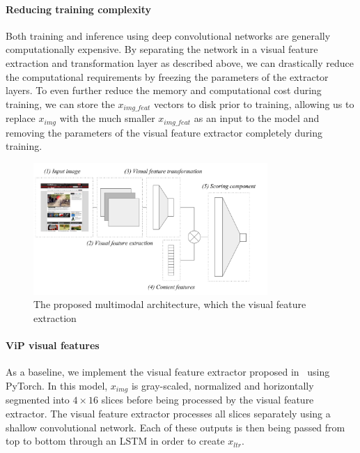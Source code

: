\paragraph{Reducing training complexity}
Both training and inference using deep convolutional networks are generally computationally expensive.
By separating the network in a visual feature extraction and transformation layer as described above, we can drastically reduce the computational requirements by freezing the parameters of the extractor layers.
To even further reduce the memory and computational cost during training, we can store the $x_{img\_feat}$ vectors to disk prior to training, allowing us to replace $x_{img}$ with the much smaller $x_{img\_feat}$ as an input to the model and removing the parameters of the visual feature extractor completely during training.

\begin{figure}[t]
\includegraphics[width = 3.5in]{images/multimodelarchitecture.pdf}
\caption{The proposed multimodal architecture, which the visual feature extraction}
\label{fig:multimodelarchitecture}
\end{figure}

\paragraph{ViP visual features}
As a baseline, we implement the visual feature extractor proposed in~\citet{fan2017learning} using PyTorch.
In this model, $x_{img}$ is gray-scaled, normalized and horizontally segmented into $4\times16$ slices before being processed by the visual feature extractor. The visual feature extractor processes all slices separately using a shallow convolutional network.
Each of these outputs is then being passed from top to bottom through an LSTM in order to create $x_{ltr}$.

